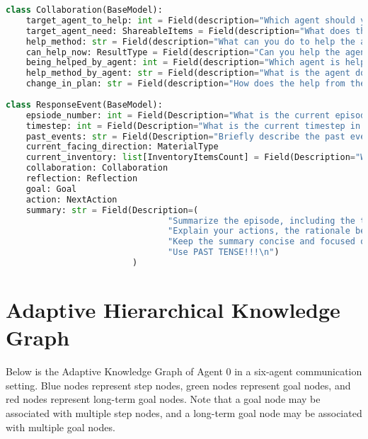 \begin{lstlisting}[language=Python]
class Collaboration(BaseModel):
    target_agent_to_help: int = Field(description="Which agent should you help, if applicable?")
    target_agent_need: ShareableItems = Field(description="What does the target agent need, if applicable?")
    help_method: str = Field(description="What can you do to help the agent, if applicable?")
    can_help_now: ResultType = Field(description="Can you help the agent now? Do you have the resources in inventory?")
    being_helped_by_agent: int = Field(description="Which agent is helping you, if applicable?")
    help_method_by_agent: str = Field(description="What is the agent doing to help you, if applicable?")
    change_in_plan: str = Field(description="How does the help from the agent change your plan, if applicable?")
    
class ResponseEvent(BaseModel):
    epsiode_number: int = Field(Description="What is the current episode?")
    timestep: int = Field(Description="What is the current timestep in the episode?")
    past_events: str = Field(Description="Briefly describe the past events in the episode.")
    current_facing_direction: MaterialType
    current_inventory: list[InventoryItemsCount] = Field(Description="What is in your current inventory? Only list items with item count greater than 0.")
    collaboration: Collaboration
    reflection: Reflection
    goal: Goal
    action: NextAction
    summary: str = Field(Description=(
                                "Summarize the episode, including the timestep, long-term goal, progress, significant events, and plan. "
                                "Explain your actions, the rationale behind your decisions. Treat as if you have done the next actions aleardy. Explain your intended support for other agents (if applicable). What should come next?"
                                "Keep the summary concise and focused on key information, using *past tense* for everything as it serves as a note for future reference. Use clear and plain language."
                                "Use PAST TENSE!!!\n")
                         )
\end{lstlisting}










\newpage
\section{Adaptive Hierarchical Knowledge Graph}
Below is the Adaptive Knowledge Graph of Agent 0 in a six-agent communication setting. Blue nodes represent step nodes, green nodes represent goal nodes, and red nodes represent long-term goal nodes. Note that a goal node may be associated with multiple step nodes, and a long-term goal node may be associated with multiple goal nodes.

